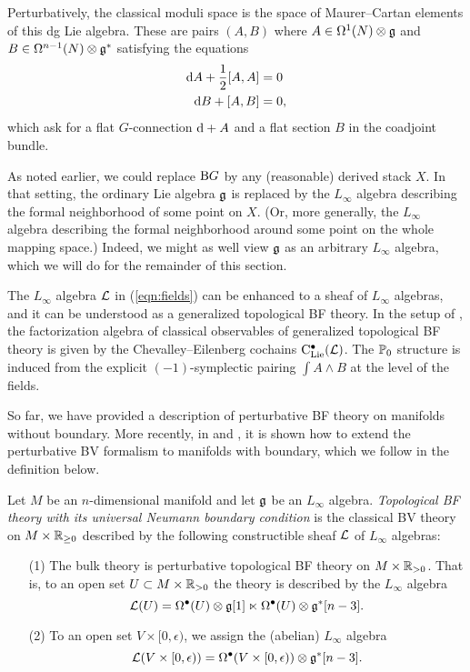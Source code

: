 \documentclass[11pt]{amsart}
\numberwithin{equation}{section}
\begin{document}
Perturbatively, the classical moduli space is the space of Maurer--Cartan elements of this dg Lie algebra.
These are pairs $(A,B)$ where $A \in \Omega^1 (N) \otimes \mathfrak g$ and $B \in \Omega^{n-1} (N) \otimes \mathfrak g^*$ satisfying the equations
\begin{align*}
{\rm d} A + \frac12 [A,A] & = 0 \\
{\rm d} B + [A,B] & = 0 ,
\end{align*}
which ask for a flat $G$-connection ${\rm d} + A$ and a flat section $B$ in the coadjoint bundle.

As noted earlier, we could replace ${\rm B}G$ by any (reasonable) derived stack $X$.
In that setting, the ordinary Lie algebra $\mathfrak g$ is replaced by the $L_\infty$ algebra describing the formal neighborhood of some point on $X$.
(Or, more generally, the $L_\infty$ algebra describing the formal neighborhood around some point on the whole mapping space.)
Indeed, we might as well view $\mathfrak g$ as an arbitrary $L_\infty$ algebra,
which we will do for the remainder of this section. 

\begin{rmk}
The $L_\infty$ algebra $\mathcal L$ in (\ref{eqn:fields}) can be enhanced to a sheaf of $L_\infty$ algebras,
and it can be understood as a generalized topological BF theory. 
In the setup of \cite{CG2}, the factorization algebra of classical observables of generalized topological BF theory is given by the Chevalley--Eilenberg cochains ${\rm C}_{\rm Lie}^\bullet (\mathcal L)$.   
The $\mathbb P_0$ structure is induced from the explicit $(-1)$-symplectic pairing $\int A \wedge B$ at the level of the fields. 
\end{rmk}

So far, we have provided a description of perturbative BF theory on manifolds without boundary. 
More recently, in \cite{ButsonYoo} and \cite{Eugene}, 
it is shown how to extend the perturbative BV formalism to manifolds with boundary, 
which we follow in the definition below. 

\begin{dfn}
Let $M$ be an $n$-dimensional manifold and let $\mathfrak g$ be an $L_\infty$ algebra. 
{\em Topological BF theory with its universal Neumann boundary condition} is the classical BV theory on $M \times \mathbb R_{\geq 0}$ described by the following constructible sheaf $\mathcal L$ of $L_\infty$ algebras:
\begin{itemize}
\item[(1)] 
The bulk theory is perturbative topological BF theory on $M \times \mathbb R_{>0}$. 
That is, to an open set $U \subset M \times \mathbb R_{>0}$ the theory is described by the $L_\infty$ algebra 
\[
\mathcal L (U) = \Omega^{\bullet} (U) \otimes \mathfrak g [1] \ltimes \Omega^{\bullet} (U) \otimes \mathfrak g^* [n-3] .
\]
\item[(2)] 
To an open set $V \times [0,\epsilon)$, we assign the (abelian) $L_\infty$ algebra
\[
\mathcal L (V \times [0,\epsilon)) = \Omega^{\bullet} (V \times [0,\epsilon)) \otimes \mathfrak g^* [n-3] .
\]
\end{itemize}
\end{dfn}
\end{document}
